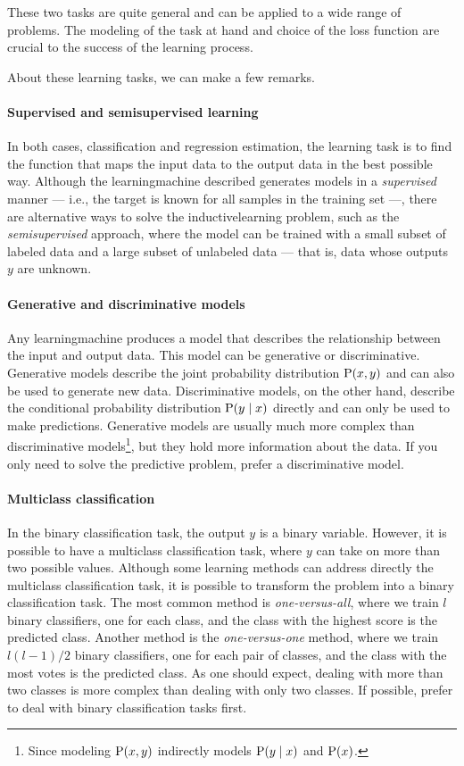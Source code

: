 These two tasks are quite general and can be applied to a wide range of problems.  The
modeling of the task at hand and choice of the \gls{loss} function are crucial to the success of
the learning process.

About these learning tasks, we can make a few remarks.

\paragraph{Supervised and semisupervised learning}
In both cases, classification and regression estimation, the learning task is to find the function
that maps the input data to the output data in the best possible way.  Although the
\gls{learningmachine} described generates models in a \emph{supervised} manner --- i.e., the target
is known for all samples in the training set ---, there are
alternative ways to solve the \gls{inductivelearning} problem, such as the \emph{semisupervised}
approach, where the model can be trained with a small subset of labeled data and a large
subset of unlabeled data --- that is, data whose outputs $y$ are unknown.

\paragraph{Generative and discriminative models}
Any \gls{learningmachine} produces a model that describes the relationship between the input
and output data.  This model can be generative or discriminative.  Generative models
describe the joint probability distribution $\operatorname{P}(x, y)$ and can also be used to generate new
data.  Discriminative models, on the other hand, describe the conditional probability
distribution $\operatorname{P}(y \mid x)$ directly and can only be used to make predictions. Generative models are
usually much more complex than discriminative models\footnote{Since modeling $\operatorname{P}(x, y)$
indirectly models $\operatorname{P}(y \mid x)$ and $\operatorname{P}(x)$.}, but they hold more information about
the data.  If you only
need to solve the predictive problem, prefer a discriminative model.

\paragraph{Multiclass classification}
In the binary classification task, the output $y$ is
a binary variable.  However, it is possible to have a multiclass classification task,
where  $y$ can take on more than two possible values.  Although some learning methods can
address directly the multiclass classification task, it is possible to transform the
problem into a binary classification task.  The most common method is
\emph{one-versus-all}, where we train $l$ binary \glspl{classifier}, one for each class,
and the class with the highest score is the predicted class.  Another method is the
\emph{one-versus-one} method, where we train $l(l-1)/2$ binary \glspl{classifier}, one for each
pair of classes, and the class with the most votes is the predicted class.
As one should expect, dealing with more than two classes is more complex than dealing
with only two classes.  If possible, prefer to deal with binary classification tasks first.

